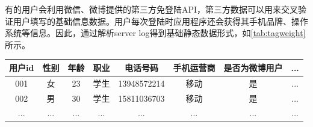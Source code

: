 \label{chap:example}
\begin{figure}
\centering
  \label{pic:hl_userProfile}
\end{figure}
有的用户会利用微信、微博提供的第三方免登陆API，第三方数据可以用来交叉验证用户填写的基础信息数据。用户每次登陆时应用程序还会获得其手机品牌、操作系统等信息。因此，通过解析server log得到基础静态数据形式，如\autoref{tab:tagweight}所示。
  \begin{table}[htp]
  \centering
  \label{tab:tagweight}
  \begin{tabular}{|c|c|c|c|c|c|c|c|} \hline
   用户id & 性别 & 年龄 & 职业 & 电话号码 & 手机运营商 & 是否为微博用户 & ... \\ \hline
   001 & 女 & 23 & 学生 & 13948572214 & 移动 & 是 & ... \\ \hline
   002 & 男 & 30 & 学生 & 15811036703 & 移动 & 是 & ... \\ \hline
   ... & ... & ... & ... & ... & ... & ... & ... \\ \hline
  \end{tabular}
  \end{table}

